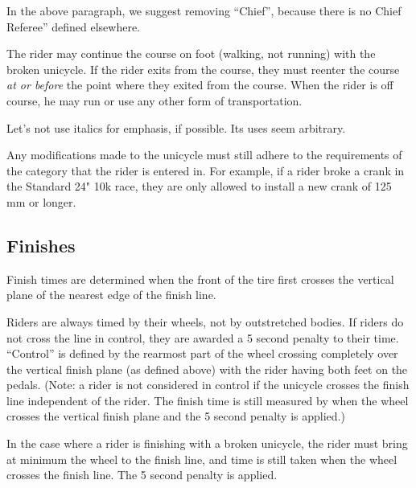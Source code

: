 \begin{framed}
In the above paragraph, we suggest removing ``Chief'', because there is no Chief Referee'' defined elsewhere.
\end{framed}

The rider may continue the course on foot (walking, not running) with the broken unicycle.
If the rider exits from the course, they must reenter the course \emph{at or before} the point where they exited from the course.
When the rider is off course, he may run or use any other form of transportation.

\begin{framed}
Let's not use italics for emphasis, if possible.  Its uses seem arbitrary.
\end{framed}

Any modifications made to the unicycle must still adhere to the requirements of the category that the rider is entered in.
For example, if a rider broke a crank in the Standard 24" 10k race, they are only allowed to install a new crank of 125 mm or longer.


\subsection{Finishes}

Finish times are determined when the front of the tire first crosses the vertical plane of the nearest edge of the finish line. 

Riders are always timed by their wheels, not by outstretched bodies.
If riders do not cross the line in control, they are awarded a 5 second penalty to their time.
``Control'' is defined by the rearmost part of the wheel crossing completely over the vertical finish plane (as defined above) with the rider having both feet on the pedals.
(Note: a rider is not considered in control if the unicycle crosses the finish line independent of the rider.
The finish time is still measured by when the wheel crosses the vertical finish plane and the 5 second penalty is applied.)

In the case where a rider is finishing with a broken unicycle, the rider must bring at minimum the wheel to the finish line, and time is still taken when the wheel crosses the finish line.
The 5 second penalty is applied.
